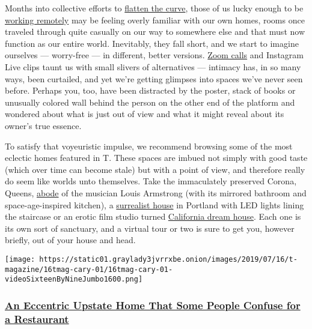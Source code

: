 Months into collective efforts to
\href{https://www.nytimes3xbfgragh.onion/article/flatten-curve-coronavirus.html}{flatten
the curve}, those of us lucky enough to be
\href{https://www.nytimes3xbfgragh.onion/2020/03/10/technology/working-from-home.html}{working
remotely} may be feeling overly familiar with our own homes, rooms once
traveled through quite casually on our way to somewhere else and that
must now function as our entire world. Inevitably, they fall short, and
we start to imagine ourselves --- worry-free --- in different, better
versions.
\href{https://www.nytimes3xbfgragh.onion/2020/04/09/technology/zoom-security.html}{Zoom
calls} and Instagram Live clips taunt us with small slivers of
alternatives --- intimacy has, in so many ways, been curtailed, and yet
we're getting glimpses into spaces we've never seen before. Perhaps you,
too, have been distracted by the poster, stack of books or unusually
colored wall behind the person on the other end of the platform and
wondered about what is just out of view and what it might reveal about
its owner's true essence.

To satisfy that voyeuristic impulse, we recommend browsing some of the
most eclectic homes featured in T. These spaces are imbued not simply
with good taste (which over time can become stale) but with a point of
view, and therefore really do seem like worlds unto themselves. Take the
immaculately preserved Corona, Queens,
\href{https://www.nytimes3xbfgragh.onion/2020/02/20/t-magazine/louis-armstrong-home-queens.html}{abode}
of the musician Louis Armstrong (with its mirrored bathroom and
space-age-inspired kitchen), a
\href{https://www.nytimes3xbfgragh.onion/2019/11/05/t-magazine/portland-house-allie-furlotti-osmose-design.html}{surrealist
house} in Portland with LED lights lining the staircase or an erotic
film studio turned
\href{https://www.nytimes3xbfgragh.onion/2018/09/14/t-magazine/los-angeles-dream-house-flamingo-estate.html}{California
dream house}. Each one is its own sort of sanctuary, and a virtual tour
or two is sure to get you, however briefly, out of your house and head.

\texttt{[image: https://static01.graylady3jvrrxbe.onion/images/2019/07/16/t-magazine/16tmag-cary-01/16tmag-cary-01-videoSixteenByNineJumbo1600.png]}

\hypertarget{an-eccentric-upstate-home-that-some-people-confuse-for-a-restaurant}{%
\subsubsection{\texorpdfstring{\textbf{\href{https://www.nytimes3xbfgragh.onion/2019/07/17/t-magazine/art/cary-leibowitz-simon-lince-upstate-home.html}{An
Eccentric Upstate Home That Some People Confuse for a
Restaurant}}}{An Eccentric Upstate Home That Some People Confuse for a Restaurant}}\label{an-eccentric-upstate-home-that-some-people-confuse-for-a-restaurant}}

